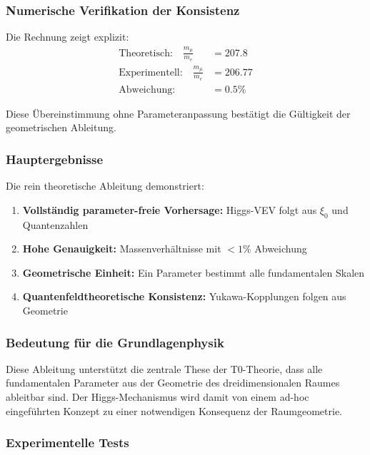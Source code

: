 \documentclass[12pt,a4paper]{article}
\theoremstyle{definition}
\begin{document}
\subsubsection{Numerische Verifikation der Konsistenz}

Die Rechnung zeigt explizit:
\begin{align}
	\text{Theoretisch:} \quad \frac{m_\mu}{m_e} &= 207.8\\
	\text{Experimentell:} \quad \frac{m_\mu}{m_e} &= 206.77\\
	\text{Abweichung:} \quad &= 0.5\%
\end{align}

Diese {\"U}bereinstimmung ohne Parameteranpassung best{\"a}tigt die G{\"u}ltigkeit der geometrischen Ableitung.

\subsubsection{Hauptergebnisse}

Die rein theoretische Ableitung demonstriert:

\begin{enumerate}
	\item \textbf{Vollst{\"a}ndig parameter-freie Vorhersage:} Higgs-VEV folgt aus $\xi_0$ und Quantenzahlen
	\item \textbf{Hohe Genauigkeit:} Massenverh{\"a}ltnisse mit $< 1\%$ Abweichung
	\item \textbf{Geometrische Einheit:} Ein Parameter bestimmt alle fundamentalen Skalen
	\item \textbf{Quantenfeldtheoretische Konsistenz:} Yukawa-Kopplungen folgen aus Geometrie
\end{enumerate}

\subsubsection{Bedeutung f{\"u}r die Grundlagenphysik}

Diese Ableitung unterst{\"u}tzt die zentrale These der T0-Theorie, dass alle fundamentalen Parameter aus der Geometrie des dreidimensionalen Raumes ableitbar sind. Der Higgs-Mechanismus wird damit von einem ad-hoc eingef{\"u}hrten Konzept zu einer notwendigen Konsequenz der Raumgeometrie.

\subsubsection{Experimentelle Tests}
\end{document}
